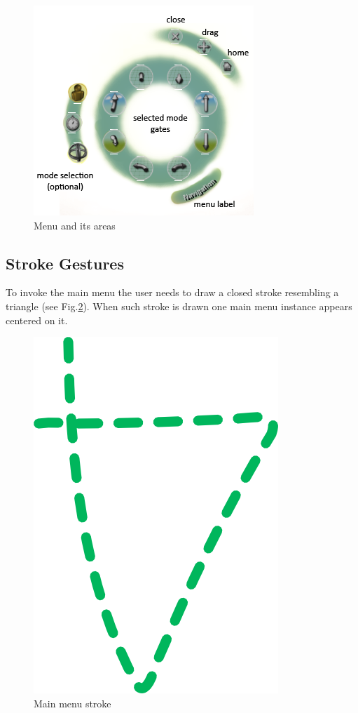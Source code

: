 

\begin{figure}[ht]
	\centering
		\includegraphics[scale=0.75]{gfx/menu.png}
	\caption{Menu and its areas}
	\label{fig:menu}
\end{figure}




\subsection{Stroke Gestures}

To invoke the main menu the user needs to draw a closed stroke resembling a triangle (see Fig.\ref{fig:triangle}).
When such stroke is drawn one main menu instance appears centered on it.

\begin{figure}[ht]
	\centering
		\includegraphics[scale=0.75]{gfx/triangle.png}
	\caption{Main menu stroke}
	\label{fig:triangle}
\end{figure}


